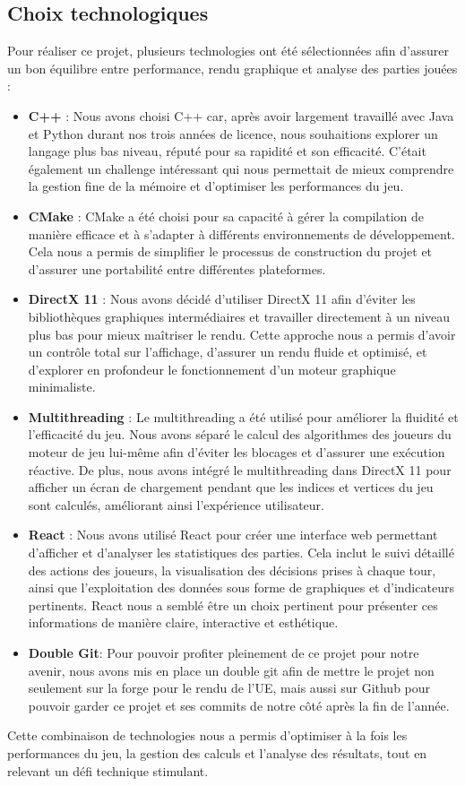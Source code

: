 \subsection{Choix technologiques}
Pour réaliser ce projet, plusieurs technologies ont été sélectionnées afin d’assurer un bon équilibre entre performance, rendu graphique et analyse des parties jouées :
\begin{itemize}
    \item \textbf{C++} : Nous avons choisi C++ car, après avoir largement travaillé avec Java et Python durant nos trois années de licence, nous souhaitions explorer un langage plus bas niveau, réputé pour sa rapidité et son efficacité. C’était également un challenge intéressant qui nous permettait de mieux comprendre la gestion fine de la mémoire et d’optimiser les performances du jeu.
    \item \textbf{CMake} : CMake a été choisi pour sa capacité à gérer la compilation de manière efficace et à s’adapter à différents environnements de développement. Cela nous a permis de simplifier le processus de construction du projet et d’assurer une portabilité entre différentes plateformes.
	\item \textbf{DirectX 11} : Nous avons décidé d’utiliser DirectX 11 afin d’éviter les bibliothèques graphiques intermédiaires et travailler directement à un niveau plus bas pour mieux maîtriser le rendu. Cette approche nous a permis d’avoir un contrôle total sur l’affichage, d’assurer un rendu fluide et optimisé, et d’explorer en profondeur le fonctionnement d’un moteur graphique minimaliste.
    \item \textbf{Multithreading} : Le multithreading a été utilisé pour améliorer la fluidité et l’efficacité du jeu. Nous avons séparé le calcul des algorithmes des joueurs du moteur de jeu lui-même afin d’éviter les blocages et d’assurer une exécution réactive. De plus, nous avons intégré le multithreading dans DirectX 11 pour afficher un écran de chargement pendant que les indices et vertices du jeu sont calculés, améliorant ainsi l’expérience utilisateur.
    \item \textbf{React} : Nous avons utilisé React pour créer une interface web permettant d’afficher et d’analyser les statistiques des parties. Cela inclut le suivi détaillé des actions des joueurs, la visualisation des décisions prises à chaque tour, ainsi que l’exploitation des données sous forme de graphiques et d’indicateurs pertinents. React nous a semblé être un choix pertinent pour présenter ces informations de manière claire, interactive et esthétique.
	\item \textbf{Double Git}: Pour pouvoir profiter pleinement de ce projet pour notre avenir, nous avons mis en place un double git afin de mettre le projet non seulement sur la forge pour le rendu de l’UE, mais aussi sur Github pour pouvoir garder ce projet et ses commits de notre côté après la fin de l’année.
\end{itemize}
Cette combinaison de technologies nous a permis d’optimiser à la fois les performances du jeu, la gestion des calculs et l’analyse des résultats, tout en relevant un défi technique stimulant.


